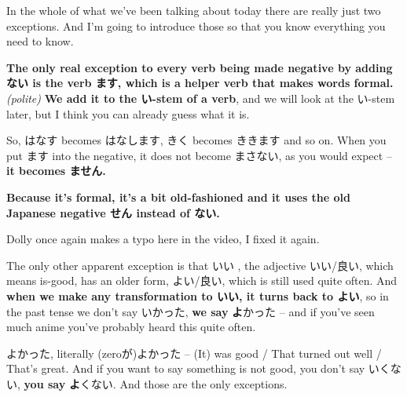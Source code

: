 \stopsectionlevel

\startsectionlevel[title={Exceptions},reference={exceptions}]

In the whole of what we've been talking about today there are really just two exceptions. And I'm going to introduce those so that you know everything you need to know.

{\bf The only real exception to every verb being made negative by adding ない is the verb ます, which is a helper verb that makes words formal.} {\em (polite)} {\bf We add it to the い-stem of a verb}, and we will look at the い-stem later, but I think you can already guess what it is.

So, はなす becomes はなします, きく becomes ききます and so on. When you put ます into the negative, it does not become まさない, as you would expect -- {\bf it becomes ません.}

{}

{\bf Because it's formal, it's a bit old-fashioned and it uses the old Japanese negative せん instead of ない.}

Dolly once again makes a typo here in the video, I fixed it again.

{}

The only other apparent exception is that いい , the adjective いい/良い, which means is-good, has an older form, よい/良い, which is still used quite often. And {\bf when we make any transformation to いい, it turns back to よい}, so in the past tense we don't say いかった, {\bf we say} {\bf よ}かった -- and if you've seen much anime you've probably heard this quite often.

{}

よかった, literally (zeroが)よかった -- (It) was good / That turned out well / That's great. And if you want to say something is not good, you don't say いくない, {\bf you say} {\bf よ}くない. And those are the only exceptions.

\stopsectionlevel

\stopsectionlevel
